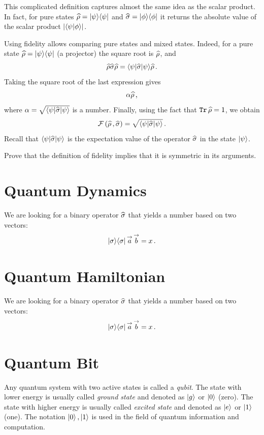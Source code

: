 This complicated definition captures almost the same idea as the scalar product. In fact, for pure states $\widehat{\rho}=|{\psi}\rangle\langle{\psi}|$ and $\widehat{\sigma}=|{\phi}\rangle\langle{\phi}|$ it returns the absolute value of the scalar product $|\langle{\psi}|{\phi\rangle}|$.

Using fidelity allows comparing pure states and mixed states. Indeed, for a pure state $\widehat{\rho}=|{\psi}\rangle\langle{\psi}|$ (a projector) the square root is $\widehat{\rho}$, and 
\[
\widehat{\rho}\widehat{\sigma}\widehat{\rho}=\langle{\psi}|\widehat{\sigma}|{\psi}\rangle\widehat{\rho}\,.
\]
Taking the square root of the last expression gives
\[
\alpha\widehat{\rho}\,,
\]
where $\alpha=\sqrt{\langle{\psi}|\widehat{\sigma}|{\psi}\rangle}$ is a number. Finally, using the fact that $\mathtt{Tr}\,\widehat{\rho}=1$, we obtain
\[
\mathcal{F}\,(\widehat{\rho}\,,\widehat{\sigma}) =\sqrt{\langle{\psi}|\widehat{\sigma}|{\psi}\rangle}\,.
\]
Recall that $\langle{\psi}|\widehat{\sigma}|{\psi}\rangle$ is the expectation value of the operator $\widehat{\sigma}$ in the state $|{\psi}\rangle$.

\begin{exercise}
	Prove that the definition of fidelity implies that it is symmetric in its arguments.
\end{exercise}

\section{Quantum Dynamics}\label{sec:QuantumDynamics}
We are looking for a binary operator $\widehat{\sigma}$ that yields a number
based on two vectors:
\[
|{\sigma}\rangle\langle{\sigma}|\,\overset{\rightarrow}{a}\,\overset{\rightarrow}{b}=x\,.
\]

\section{Quantum Hamiltonian}\label{sec:QuantumHamiltonian}
We are looking for a binary operator $\widehat{\sigma}$ that yields a number
based on two vectors:
\[
|{\sigma}\rangle\langle{\sigma}|\,\overset{\rightarrow}{a}\,\overset{\rightarrow}{b}=x\,.
\]


\section{Quantum Bit}\label{sec:Qubit}
Any quantum system with two active states is called a \emph{qubit}. The state with lower energy is usually called \emph{ground state} and denoted as $|{g}\rangle$ or $|{0}\rangle$ (zero). The state with higher energy is usually called \emph{excited state} and denoted as $|{e}\rangle$ or $|{1}\rangle$ (one). The notation $|{0}\rangle\,,|{1}\rangle$ is used in the field of quantum information and computation.

